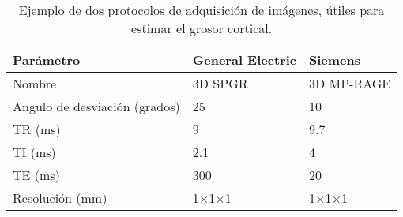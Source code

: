 \begin{table}[]
\centering
\caption{Ejemplo de dos protocolos de adquisición de imágenes, útiles para estimar el grosor cortical.}
\label{tab:grosor_protocolos}
\begin{tabular}{@{}lll@{}}
\toprule
Parámetro                     & General Electric & Siemens    \\ \midrule
Nombre                        & 3D SPGR          & 3D MP-RAGE \\
Angulo de desviación (grados) & 25               & 10         \\
TR (ms)                       & 9                & 9.7        \\
TI (ms)                       & 2.1              & 4          \\
TE (ms)                       & 300              & 20         \\
Resolución (mm)               & 1$\times$1$\times$1            & 1$\times$1$\times$1      \\ \bottomrule
\end{tabular}
\end{table}